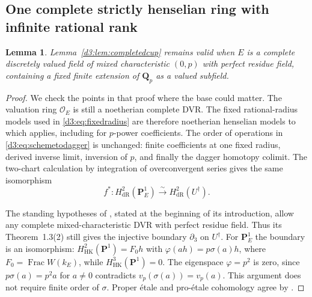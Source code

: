 \documentclass[11pt,a4paper]{amsart}
\numberwithin{equation}{section}
\newtheorem{lemma}[theorem]{Lemma}
\theoremstyle{definition}
\theoremstyle{remark}
\newcommand{\Q}{\mathbf Q}
\newcommand{\PP}{\mathbf P}
\newcommand{\OO}{\mathcal O}
\newcommand{\Frac}{\operatorname{Frac}}
\begin{document}
\subsection{One complete strictly henselian ring with infinite rational rank}

\begin{lemma}\label{d3:lem:completedcupperfect}
Lemma~\ref{d3:lem:completedcup} remains valid when $E$ is a complete
discretely valued field of mixed characteristic $(0,p)$ with perfect
residue field, containing a fixed finite extension of $\Q_p$ as a valued
subfield.
\end{lemma}
\begin{proof}
We check the points in that proof where the base could matter.
The valuation ring $\OO_E$ is still a noetherian complete DVR.
The fixed rational-radius models used in \eqref{d3:eq:fixedradius}
are therefore noetherian henselian models to which
\cite[Theorem~6.2.1]{Achinger} applies, including for $p$-power coefficients.
The order of operations in \eqref{d3:eq:schemetodagger} is unchanged:
finite coefficients at one fixed radius, derived inverse limit,
inversion of $p$, and finally the dagger homotopy colimit.
The two-chart calculation by integration of overconvergent series gives
the same isomorphism
\[
 f^*:H^2_{\mathrm{dR}}(\PP^1_E)
       \xrightarrow{\sim}H^2_{\mathrm{dR}}(U^\dagger).
\]

The standing hypotheses of \cite{ColmezNiziol}, stated at the beginning
of its introduction, allow any complete mixed-characteristic DVR with
perfect residue field. Thus its Theorem~1.3(2) still gives the injective
boundary $\partial_3$ on $U^\dagger$.
For $\PP^1_E$ the boundary is an isomorphism:
$H^2_{\mathrm{HK}}(\PP^1)=F_0h$ with
$\varphi(ah)=p\sigma(a)h$, where
$F_0=\Frac W(k_E)$, while $H^3_{\mathrm{HK}}(\PP^1)=0$.
The eigenspace $\varphi=p^2$ is zero, since
$p\sigma(a)=p^2a$ for $a\ne0$ contradicts
$v_p(\sigma(a))=v_p(a)$.
This argument does not require finite order of $\sigma$.
Proper \'etale and pro-\'etale cohomology agree by
\cite[Section~7.2.4]{ColmezNiziol}.


\end{proof}
\end{document}
